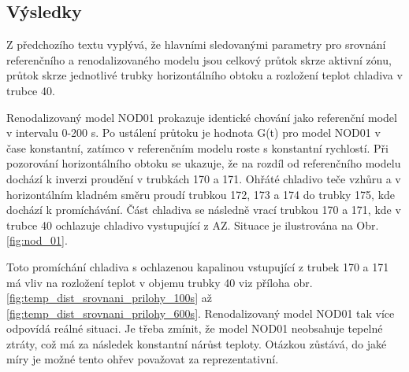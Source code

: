 \subsection{Výsledky}
Z předchozího textu vyplývá, že hlavními sledovanými parametry pro srovnání referenčního a renodalizovaného modelu jsou celkový průtok skrze aktivní zónu, průtok skrze jednotlivé trubky horizontálního obtoku a rozložení teplot chladiva v trubce 40.

Renodalizovaný model NOD01 prokazuje identické chování jako referenční model v intervalu 0-200 s. Po ustálení průtoku je hodnota G(t) pro model NOD01 v čase konstantní, zatímco v referenčním modelu roste s konstantní rychlostí. Při pozorování horizontálního obtoku se ukazuje, že na rozdíl od referenčního modelu dochází k inverzi proudění v trubkách 170 a 171. Ohřáté chladivo teče vzhůru a v horizontálním kladném směru proudí trubkou 172, 173 a 174 do trubky 175, kde dochází k promíchávání. Část chladiva se následně vrací trubkou 170 a 171, kde v trubce 40 ochlazuje chladivo vystupující z AZ. Situace je ilustrována na Obr. \ref{fig:nod_01}.

Toto promíchání chladiva s ochlazenou kapalinou vstupující z trubek 170 a 171 má vliv na rozložení teplot v objemu trubky 40 viz příloha obr. \ref{fig:temp_dist_srovnani_prilohy_100s} až \ref{fig:temp_dist_srovnani_prilohy_600s}. Renodalizovaný model NOD01 tak více odpovídá reálné situaci. Je třeba zmínit, že model NOD01 neobsahuje tepelné ztráty, což má za následek konstantní nárůst teploty. Otázkou zůstává, do jaké míry je možné tento ohřev považovat za reprezentativní. 




